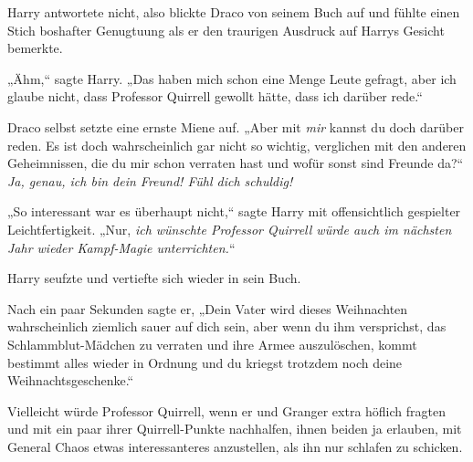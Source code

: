 Harry antwortete nicht, also blickte Draco von seinem Buch auf und fühlte einen Stich boshafter Genugtuung als er den traurigen Ausdruck auf Harrys Gesicht bemerkte.

„Ähm,“ sagte Harry. „Das haben mich schon eine Menge Leute gefragt, aber ich glaube nicht, dass Professor Quirrell gewollt hätte, dass ich darüber rede.“

Draco selbst setzte eine ernste Miene auf. „Aber mit \emph{mir} kannst du doch darüber reden. Es ist doch wahrscheinlich gar nicht so wichtig, verglichen mit den anderen Geheimnissen, die du mir schon verraten hast und wofür sonst sind Freunde da?“ \emph{Ja, genau, ich bin dein Freund! Fühl dich schuldig!}

„So interessant war es überhaupt nicht,“ sagte Harry mit offensichtlich gespielter Leichtfertigkeit. „Nur, \emph{ich wünschte Professor Quirrell würde auch im nächsten Jahr wieder Kampf-Magie unterrichten.}“

Harry seufzte und vertiefte sich wieder in sein Buch.

Nach ein paar Sekunden sagte er, „Dein Vater wird dieses Weihnachten wahrscheinlich ziemlich sauer auf dich sein, aber wenn du ihm versprichst, das Schlammblut-Mädchen zu verraten und ihre Armee auszulöschen, kommt bestimmt alles wieder in Ordnung und du kriegst trotzdem noch deine Weihnachtsgeschenke.“

Vielleicht würde Professor Quirrell, wenn er und Granger extra höflich fragten und mit ein paar ihrer Quirrell-Punkte nachhalfen, ihnen beiden ja erlauben, mit General Chaos etwas interessanteres anzustellen, als ihn nur schlafen zu schicken.

